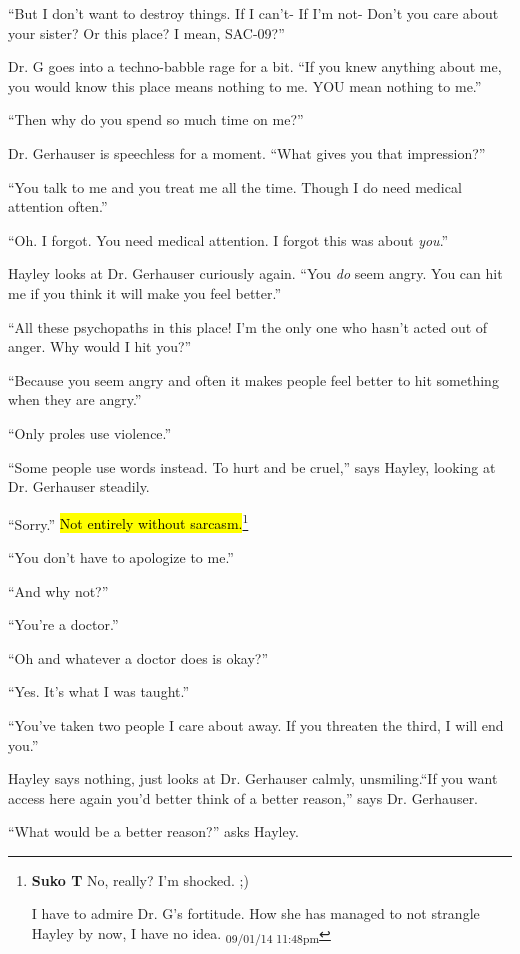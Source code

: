 ``But I don't want to destroy things.  If I can't- If I'm not- Don't you care about your sister?  Or this place?  I mean, SAC-09?''

Dr. G goes into a techno-babble rage for a bit.  ``If you knew anything about me, you would know this place means nothing to me.  YOU mean nothing to me.''

``Then why do you spend so much time on me?''

Dr. Gerhauser is speechless for a moment. ``What gives you that impression?''

``You talk to me and you treat me all the time.  Though I do need medical attention often.''

``Oh.  I forgot.  You need medical attention.  I forgot this was about \textit{you}.''

Hayley looks at Dr. Gerhauser curiously again.  ``You \textit{do} seem angry.  You can hit me if you think it will make you feel better.''

``All these psychopaths in this place! I'm the only one who hasn't acted out of anger.  Why would I hit you?''

``Because you seem angry and often it makes people feel better to hit something when they are angry.''

``Only proles use violence.''

``Some people use words instead.  To hurt and be cruel,'' says Hayley, looking at Dr. Gerhauser steadily.

``Sorry.'' \hl{Not entirely without sarcasm.}\footnote{\textbf{Suko T }No, really?  I'm shocked.  ;)  

I have to admire Dr. G's fortitude.  How she has managed to not strangle Hayley by now, I have no idea. \textsubscript{09/01/14 11:48pm}}

``You don't have to apologize to me.''

``And why not?''

``You're a doctor.''

``Oh and whatever a doctor does is okay?''

``Yes.  It's what I was taught.''

``You've taken two people I care about away.  If you threaten the third, I will end you.''

Hayley says nothing, just looks at Dr. Gerhauser calmly, unsmiling.``If you want access here again you'd better think of a better reason,'' says Dr. Gerhauser.

``What would be a better reason?'' asks Hayley.

